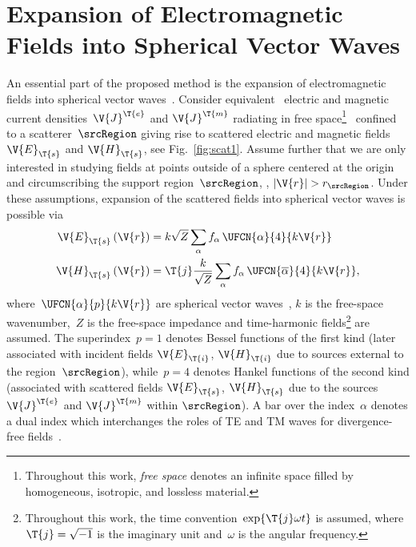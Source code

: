 \documentclass[journal]{IEEEtran}
\providecommand{\Je}{\V{J}^\T{e}} %
\providecommand{\Jm}{\V{J}^\T{m}} %
\providecommand{\aCircum}{r_\srcRegion} %
\begin{document}
\section{Expansion of Electromagnetic Fields into Spherical Vector Waves}
\label{sec:ElmagDescrip}

An essential part of the proposed method is the expansion of electromagnetic fields into spherical vector waves~\cite{Stratton_ElectromagneticTheory,Kristensson_ScatteringBook}. Consider equivalent~\cite{Balanis1989} electric and magnetic current densities~$\Je$ and $\Jm$ radiating in free space\footnote{Throughout this work, \emph{free space} denotes an infinite space filled by homogeneous, isotropic, and lossless material.}~\cite{Balanis1989} confined to a scatterer~$\srcRegion$ giving rise to scattered electric and magnetic fields~$\V{E}_\T{s}$ and $\V{H}_\T{s}$, see Fig.~\ref{fig:scat1}. Assume further that we are only interested in studying fields at points outside of a sphere centered at the origin and circumscribing the support region~$\srcRegion$, \ie{}, $|\V{r}|>\aCircum$.  Under these assumptions, expansion of the scattered fields into spherical vector waves is possible via
\begin{equation}
\begin{aligned}
    \label{eq:EHExpansion}
    \V{E}_\T{s}\left(\V{r}\right) &= k\sqrt{Z}\sum_\alpha   f_{\alpha}\,\UFCN{\alpha}{4}{k\V{r}} \\
        \V{H}_\T{s}\left(\V{r}\right) &= \T{j} \dfrac{k}{\sqrt{Z}} \sum_\alpha  f_{\alpha}\,\UFCN{\overline{\alpha}}{4}{k\V{r}},
\end{aligned}
\end{equation}
where~$\UFCN{\alpha}{p}{k\V{r}}$ are spherical vector waves~\cite[Chap.~7]{Kristensson_ScatteringBook}, $k$ is the free-space wavenumber,~$Z$ is the free-space impedance and time-harmonic fields\footnote{Throughout this work, the time convention~$\exp{\T{j} \omega t}$ is assumed, where $\T{j} = \sqrt{-1}$ is the imaginary unit and~$\omega$ is the angular frequency.} are assumed.   The superindex~$p = 1$ denotes Bessel functions of the first kind (later associated with incident fields $\V{E}_\T{i}$, $\V{H}_\T{i}$ due to sources external to the region~$\srcRegion$), while~$p = 4$ denotes Hankel functions of the second kind (associated with scattered fields $\V{E}_\T{s}$, $\V{H}_\T{s}$ due to the sources $\V{J}^\T{e}$ and $\V{J}^\T{m}$ within $\srcRegion$). A bar over the index~$\alpha$ denotes a dual index which interchanges the roles of TE and TM waves for divergence-free fields~\cite[Chap.~7.2]{Kristensson_ScatteringBook}.
\end{document}
